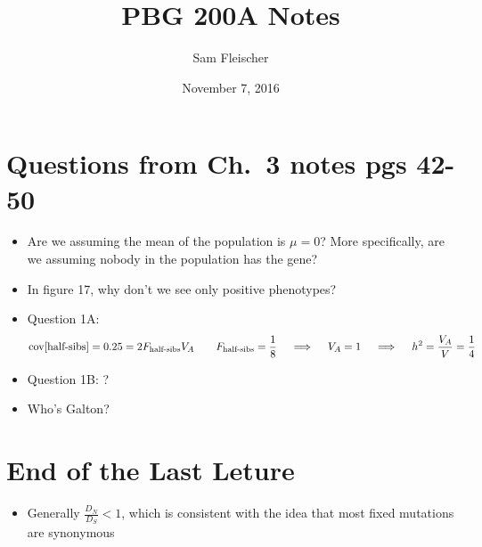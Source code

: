 \documentclass{article}
\title{PBG 200A Notes}
\author{Sam Fleischer}
\date{November 7, 2016}
\newcommand{\qiq}{\ \ \ \implies\ \ \ }
\newcommand{\cov}[1]{\text{cov}\qty[#1]}
\begin{document}
    \maketitle

    \section{Questions from Ch.~3 notes pgs 42-50}
        \begin{itemize}
            \item Are we assuming the mean of the population is $\mu=0$?  More specifically, are we assuming nobody in the population has the gene?
            \item In figure 17, why don't we see only positive phenotypes?
            \item Question 1A:
            \begin{align*}
                \cov{\text{half-sibs}} = 0.25 = 2F_{\text{half-sibs}}V_A \qquad F_{\text{half-sibs}} = \frac{1}{8} \qiq V_A = 1 \qiq h^2 = \frac{V_A}{V} = \frac{1}{4}
            \end{align*}
            \item Question 1B: ?
            \item Who's Galton?
        \end{itemize}

    \section{End of the Last Leture}
        \begin{itemize}
            \item Generally $\frac{D_N}{D_S} < 1$, which is consistent with the idea that most fixed mutations are synonymous
        \end{itemize}
\end{document}
